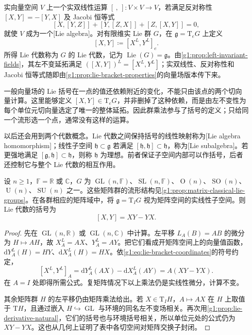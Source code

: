 \begin{definition}[Lie 代数]\label{g1:def:lie-algebra-group}
	实向量空间 \(V\) 上一个实双线性运算 \([\ ,\ ]:V\times V\to V\)，若满足反对称性 \([X,Y]=-[Y,X]\) 及 Jacobi 恒等式
	\[
		[X,[Y,Z]]+[Y,[Z,X]]+[Z,[X,Y]]=0,
	\]
	就使 \(V\) 成为一个[Lie algebra]。对有限维实 Lie 群 \(G\)，在 \(\mathfrak g=\mathrm{T}_eG\) 上定义
	\[
		[X,Y]\coloneqq[X^L,Y^L]_e.
	\]
	所得 Lie 代数称为 \(G\) 的 Lie 代数，记为 \(\operatorname{Lie}(G)=\mathfrak g\)。由\cref{g1:prop:left-invariant-fields}，其左不变延拓满足 \(([X,Y])^L=[X^L,Y^L]\)；实双线性、反对称性和 Jacobi 恒等式随即由\cref{g1:prop:lie-bracket-properties}的向量场版本传下来。
\end{definition}

一般向量场的 Lie 括号在一点的值还依赖附近的变化，不能只由该点的两个切向量计算。这里能够定义 \([X,Y]\in \mathrm{T}_eG\)，并非删掉了这种依赖，而是由左不变性为每个单位元切向量选定了唯一的整体延拓。因此群乘法参与了括号的定义；只给同一个流形选一个点，通常没有这样的运算。

\ProseParagraphBreak

以后还会用到两个代数概念。Lie 代数之间保持括号的线性映射称为[Lie algebra homomorphism]；线性子空间 \(\mathfrak h\subset\mathfrak g\) 若满足 \([\mathfrak h,\mathfrak h]\subset\mathfrak h\)，称为[Lie subalgebra]。若更强地满足 \([\mathfrak g,\mathfrak h]\subset\mathfrak h\)，则称 \(\mathfrak h\) 为理想。前者保证子空间内部可以作括号，后者还控制它与整个 Lie 代数的相互作用。

\begin{proposition}\label{g1:prop:matrix-lie-bracket}
	设 \(n\ge1\)，\(\mathbb F=\mathbb R\) 或 \(\mathbb C\)，\(G\) 为 \(\operatorname{GL}(n,\mathbb F)\)、\(\operatorname{SL}(n,\mathbb F)\)、\(\operatorname{O}(n)\)、\(\operatorname{SO}(n)\)、\(\operatorname{U}(n)\)、\(\operatorname{SU}(n)\) 之一。这些矩阵群的流形结构见\cref{g1:prop:matrix-classical-lie-groups}。在各群相应的矩阵域中，将 \(\mathfrak g=\mathrm{T}_IG\) 视为矩阵空间的实线性子空间。则 Lie 代数的括号为
	\[
		[X,Y]=XY-YX.
	\]
\end{proposition}
\begin{proof}
	先在 \(\operatorname{GL}(n,\mathbb R)\) 或 \(\operatorname{GL}(n,\mathbb C)\) 中计算。左平移 \(L_A(B)=AB\) 的微分为 \(H\mapsto AH\)，故 \(X^L_A=AX\)、\(Y^L_A=AY\)。把它们看成开矩阵空间上的向量值函数，\(\mathrm{d}Y^L_A(H)=HY\)、\(\mathrm{d}X^L_A(H)=HX\)。依\eqref{g1:eq:lie-bracket-coordinates}的符号约定，
	\[
		[X^L,Y^L]_A
		=\mathrm{d}Y^L_A(AX)-\mathrm{d}X^L_A(AY)
		=A(XY-YX).
	\]
	在 \(A=I\) 处即得所需公式。复矩阵情况下以上乘法仍是实线性微分，计算不变。

	其余矩阵群 \(H\) 的左平移仍由矩阵乘法给出。若 \(X\in \mathrm{T}_IH\)，\(A\mapsto AX\) 在 \(H\) 上取值于 \(\mathrm{T}H\)，且通过嵌入 \(H\hookrightarrow\operatorname{GL}\) 与环境的同名左不变场相关。再次用\cref{g1:prop:lie-derivative-natural}，它们的括号也与环境括号相关，所以单位元处的公式仍为 \(XY-YX\)。这也从几何上证明了表中各切空间对矩阵交换子封闭。
\end{proof}


